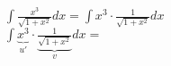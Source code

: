 $\int\frac{x^{3}}{\sqrt{1+x^{2}}}dx=\int x^{3}\cdot\frac{1}{\sqrt{1+x^{2}}}dx$\\
$ \int \underbrace{x^{3}}_{u'}\cdot\underbrace{\frac{1}{\sqrt{1+x^{2}}}}_{v}dx= $
\newpage